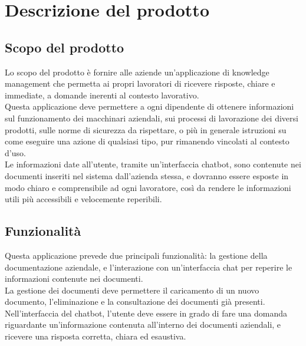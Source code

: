 \chapter{Descrizione del prodotto} \label{cap:descr}
\section{Scopo del prodotto}
Lo scopo del prodotto è fornire alle aziende un’applicazione di knowledge management che permetta ai propri lavoratori di ricevere risposte, chiare e immediate, a domande inerenti al contesto lavorativo.\\
Questa applicazione deve permettere a ogni dipendente di ottenere informazioni sul funzionamento dei macchinari aziendali, sui processi di lavorazione dei diversi prodotti, sulle norme di sicurezza da rispettare, o più in generale istruzioni su come eseguire una azione di qualsiasi tipo, pur rimanendo vincolati al contesto d’uso.\\
Le informazioni date all'utente, tramite un’interfaccia chatbot, sono contenute nei documenti inseriti nel sistema dall’azienda stessa, e dovranno essere esposte in modo chiaro e comprensibile ad ogni lavoratore, così da rendere le informazioni utili più accessibili e velocemente reperibili.


\section{Funzionalità}
Questa applicazione prevede due principali funzionalità: la gestione della documentazione aziendale, e l’interazione con un’interfaccia chat per reperire le informazioni contenute nei documenti.\\
La gestione dei documenti deve permettere il caricamento di un nuovo documento, l’eliminazione e la consultazione dei documenti già presenti.\\
Nell’interfaccia del chatbot, l’utente deve essere in grado di fare una domanda riguardante un’informazione contenuta all’interno dei documenti aziendali, e ricevere una risposta corretta, chiara ed esaustiva.


